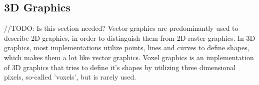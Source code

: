 \subsection{3D Graphics}
//TODO: Is this section needed?
Vector graphics are predominantly used to describe 2D graphics, in order to distinguish them from 2D raster graphics. 
In 3D graphics, most implementations utilize points, lines and curves to define shapes, which makes them a lot like vector graphics. 
Voxel graphics is an implementation of 3D graphics that tries to define it's shapes by utilizing three dimensional pixels, so-called 'voxels', but is rarely used.